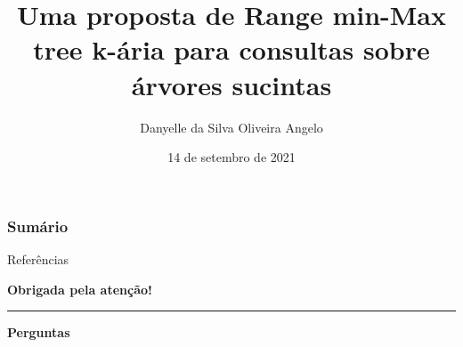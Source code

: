 \documentclass[pt]{ifbclass/apresentacao-ifb}
\author{Danyelle da Silva Oliveira Angelo}
\title{Uma proposta de Range min-Max tree k-ária para consultas sobre árvores sucintas}
\institute{Instituto Federal de Brasília, Câmpus Taguatinga}
\date{14 de setembro de 2021}
\begin{document}
\maketitle

\begin{frame}{}
	\frametitle{Sumário}
	\tableofcontents[sectionstyle=show/show]
\end{frame}









\begin{frame}[allowframebreaks]{Referências}
    
    
\end{frame}


\begin{frame}{}
    \centering
  \textbf{Obrigada pela atenção!}
  
  \vspace{0.4cm}
  
  \rule[0.4cm]{6cm}{0.6pt}
  
  \textbf{Perguntas}
\end{frame}
\end{document}
